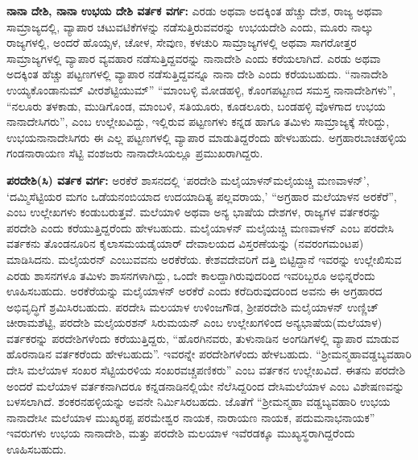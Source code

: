 \textbf{ನಾನಾ ದೇಶಿ, ನಾನಾ ಉಭಯ ದೇಶಿ ವರ್ತಕ ವರ್ಗ: } ಎರಡು ಅಥವಾ ಅದಕ್ಕಿಂತ ಹೆಚ್ಚು ದೇಶ, ರಾಜ್ಯ ಅಥವಾ ಸಾಮ್ರಾಜ್ಯದಲ್ಲಿ, ವ್ಯಾಪಾರ ಚಟುವಟಿಕೆಗಳನ್ನು ನಡೆಸುತ್ತಿರುವವರನ್ನು ಉಭಯದೇಶಿ ಎಂದು, ಮೂರು ನಾಲ್ಕು ರಾಜ್ಯಗಳಲ್ಲಿ, ಅಂದರೆ ಹೊಯ್ಸಳ, ಚೋಳ, ಸೇವುಣ, ಕಳಚುರಿ ಸಾಮ್ರಾಜ್ಯಗಳಲ್ಲಿ ಅಥವಾ ಸಾಗರೋತ್ತರ ಸಾಮ್ರಾಜ್ಯಗಳಲ್ಲಿ ವ್ಯಾಪಾರ ವ್ಯವಹಾರ ನಡೆಸುತ್ತಿದ್ದವರನ್ನು ನಾನಾದೇಶಿ ಎಂದು ಕರೆಯಲಾಗಿದೆ. ಎರಡು ಅಥವಾ ಅದಕ್ಕಿಂತ ಹೆಚ್ಚು ಪಟ್ಟಣಗಳಲ್ಲಿ ವ್ಯಾಪಾರ ನಡೆಸುತ್ತಿದ್ದವನ್ನೂ ನಾನಾ ದೇಶಿ ಎಂದು ಕರೆಯಬಹುದು. “ನಾನಾದೇಶಿ ಉಯ್ಯಕೊಂಡಾನುಮ್ ವೀರಶೆಟ್ಟಿಯುಮ್” “ಮಾಂಬಳ್ಳಿ ಮೋಡಹಳ್ಳಿ, ಕೊಂಗಪಟ್ಟಣದ ಸಮಸ್ತ ನಾನಾದೇಶಿಗಳು”, “ನಲೂರು ತಳಕಾಡು, ಮುಡಿಗೊಂಡ, ಮಾಂಬಳಿ, ಸತಿಯೂರು, ಕೂಡಲೂರು, ಬಂಡಹಳ್ಳಿ ವೊಳಗಾದ ಉಭಯ ನಾನಾದೇಸಿಗರು”, ಎಂಬ ಉಲ್ಲೇಖವಿದ್ದು, ಇಲ್ಲಿರುವ ಪಟ್ಟಣಗಳು ಕನ್ನಡ ಹಾಗೂ ತಮಿಳು ಸಾಮ್ರಾಜ್ಯಕ್ಕೆ ಸೇರಿದ್ದು, ಉಭಯನಾನಾದೇಸಿಗರು ಈ ಎಲ್ಲ ಪಟ್ಟಣಗಳಲ್ಲಿ ವ್ಯಾಪಾರ ಮಾಡುತಿದ್ದರೆಂದು ಹೇಳಬಹುದು. ಅಗ್ರಹಾರಬಾಚಹಳ್ಳಿಯ ಗಂಡನಾರಾಯಣ ಸೆಟ್ಟಿ ವಂಶಜರು ನಾನಾದೇಸಿಯಲ್ಲೂ ಪ್ರಮುಖರಾಗಿದ್ದರು.

\textbf{ಪರದೇಶಿ(ಸಿ) ವರ್ತಕ ವರ್ಗ: } ಅರಕೆರೆ ಶಾಸನದಲ್ಲಿ ‘ಪರದೇಶಿ ಮಲೈಯಾಳನ್​ ಮಲೈಯಚ್ಚಿ ಮಣವಾಳನ್​’, ‘ದಮ್ಮಿಸೆಟ್ಟಿಯರ ಮಗಂ ಒಡೆಯನಂಬಿಯಾದ ಉದಯಾದಿತ್ಯ ಪಲ್ಲವರಾಯ,’ “ಅಗ್ರಹಾರ ಮಲೆಯಾಳನ ಅರಕೆರೆ”, ಎಂಬ ಉಲ್ಲೇಖಗಳು ಕಂಡುಬರುತ್ತವೆ. ಮಲೆಯಾಳಿ ಅಥವಾ ಅನ್ಯ ಭಾಷೆಯ ದೇಶಗಳ, ರಾಜ್ಯಗಳ ವರ್ತಕರನ್ನು ಪರದೇಶಿ ಎಂದು ಕರೆಯುತ್ತಿದ್ದರೆಂದು ಹೇಳಬಹುದು. ಮಲೈಯಾಳನ್​ ಮಲೈಯಚ್ಚಿ ಮಣವಾಳನ್​ ಎಂಬ ಪರದೇಸಿ ವರ್ತಕನು ತೊಂಡನೂರಿನ ಕೈಲಾಸಮಯಡೈಯಾರ್​ ದೇವಾಲಯದ ವಿಸ್ತರಣೆಯನ್ನು (ನವರಂಗಮಂಟಪ) ಮಾಡಿಸಿದನು. ಮಲೈಯರನ್​ ಎಂಬುವವನು ಅರಕೆರೆಯ. ಕೇಶವದೇವರಿಗೆ ದತ್ತಿ ಬಿಟ್ಟಿದ್ದಾನೆ ಇವರನ್ನು ಉಲ್ಲೇಖಿಸುವ ಎರಡು ಶಾಸನಗಳೂ ತಮಿಳು ಶಾಸನಗಳಾಗಿದ್ದು, ಒಂದೇ ಕಾಲದ್ದಾಗಿರುವುದರಿಂದ ಇವರಿಬ್ಬರೂ ಅಭಿನ್ನರೆಂದು ಊಹಿಸಬಹುದು. ಅರಕೆರೆಯನ್ನು ಮಲೈಯಾಳನ್​ ಅರಕೆರೆ ಎಂದು ಕರೆದಿರುವುದರಿಂದ ಅವನು ಈ ಅಗ್ರಹಾರದ ಅಭಿವೃದ್ಧಿಗೆ ಶ್ರಮಿಸಿರಬಹುದು. ಪರದೇಸಿ ಮಲಯಾಳ ಉಳಿಂಜಗೌಡ, ಶ‍್ರೀಪರದೇಶಿ ಮಲೈಯಾಳನ್​ ಉಣ್ಣಿಚ್​ ಚೀರಾಮಶೆಟ್ಟಿ, ಪರದೇಶಿ ಮಲೈಯರಶನ್​ ಸಿರುಮಯನ್​ ಎಂಬ ಉಲ್ಲೇಖಗಳಿಂದ ಅನ್ಯಭಾಷೆಯ(ಮಲೆಯಾಳ) ವರ್ತಕರನ್ನು ಪರದೇಶಿಗಳೆಂದು ಕರೆಯುತ್ತಿದ್ದರು, “ಹೊರಗಿನವರು, ತುಳುನಾಡಿನ ಅಂಗಡಿಗಳಲ್ಲಿ ವ್ಯಾಪಾರ ಮಾಡುವ ಹೊರನಾಡಿನ ವರ್ತಕರೆಂದು ಹೇಳಬಹುದು”. ಇವರನ್ನೇ ಪರದೇಶಿಗಳೆಂದು ಹೇಳಬಹುದು. “ಶ‍್ರೀಮನ್ಮಹಾವಡ್ಡಬ್ಯವಹಾರಿ ದೇಸಿ ಮಲೆಯಾಳ ಸಂಖರ ಸೆಟ್ಟಿಯರಳಿಯ ಸಂಖರವಚ್ಚಪಣಿಕರು” ಎಂಬ ವರ್ತಕನ ಉಲ್ಲೇಖವಿದೆ. ಈತನು ಪರದೇಶಿ ಅಂದರೆ ಮಲೆಯಾಳ ವರ್ತಕನಾಗಿದರೂ ಕನ್ನಡನಾಡಿನಲ್ಲಿಯೇ ನೆಲೆಸಿದ್ದರಿಂದ ದೇಸಿಮಲೆಯಾಳ ಎಂಬ ವಿಶೇಷಣವನ್ನು ಬಳಸಲಾಗಿದೆ. ಶಂಕರನಹಳ್ಳಿಯನ್ನು ಅವನೇ ನಿರ್ಮಿಸಿರಬಹದು. ಜೊತೆಗೆ “ಶ‍್ರೀಮನ್ಮಹಾ ವಡ್ಡಬ್ಯವಹಾರಿ ಉಭಯ ನಾನಾದೇಸೀ ಮಲೆಯಾಳ ಮುಖ್ಯರಪ್ಪ ಪರಮೇಶ್ವರ ನಾಯಕ, ನಾರಾಯಣ ನಾಯಕ, ಪದುಮನಾಭನಾಯಕ” ಇವರುಗಳು ಉಭಯ ನಾನಾದೇಶಿ, ಮತ್ತು ಪರದೇಶಿ ಮಲಯಾಳ ಇವೆರಡಕ್ಕೂ ಮುಖ್ಯಸ್ಥರಾಗಿದ್ದರೆಂದು ಊಹಿಸಬಹುದು.


